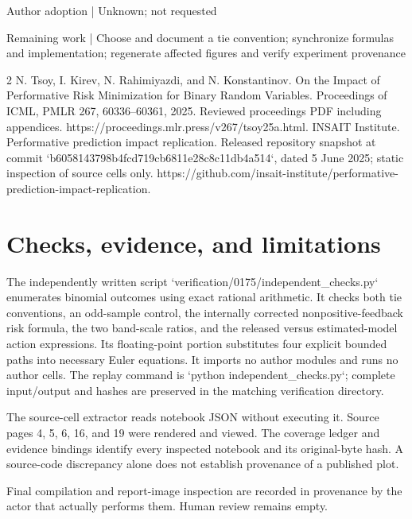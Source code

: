 \documentclass[10pt]{article}
\begin{document}
Author adoption | Unknown; not requested\par
Remaining work | Choose and document a tie convention; synchronize formulas and implementation; regenerate affected figures and verify experiment provenance\par
2 N. Tsoy, I. Kirev, N. Rahimiyazdi, and N. Konstantinov. On the Impact of Performative Risk Minimization for Binary Random Variables. Proceedings of ICML, PMLR 267, 60336–60361, 2025. Reviewed proceedings PDF including appendices. https://proceedings.mlr.press/v267/tsoy25a.html. INSAIT Institute. Performative prediction impact replication. Released repository snapshot at commit `b6058143798b4fcd719cb6811e28c8c11db4a514`, dated 5 June 2025; static inspection of source cells only. https://github.com/insait-institute/performative-prediction-impact-replication.\par
\section*{Checks, evidence, and limitations}
The independently written script `verification/0175/independent\_checks.py` enumerates binomial outcomes using exact rational arithmetic. It checks both tie conventions, an odd-sample control, the internally corrected nonpositive-feedback risk formula, the two band-scale ratios, and the released versus estimated-model action expressions. Its floating-point portion substitutes four explicit bounded paths into necessary Euler equations. It imports no author modules and runs no author cells. The replay command is `python independent\_checks.py`; complete input/output and hashes are preserved in the matching verification directory.\par
The source-cell extractor reads notebook JSON without executing it. Source pages 4, 5, 6, 16, and 19 were rendered and viewed. The coverage ledger and evidence bindings identify every inspected notebook and its original-byte hash. A source-code discrepancy alone does not establish provenance of a published plot.\par
Final compilation and report-image inspection are recorded in provenance by the actor that actually performs them. Human review remains empty.\par
\end{document}
